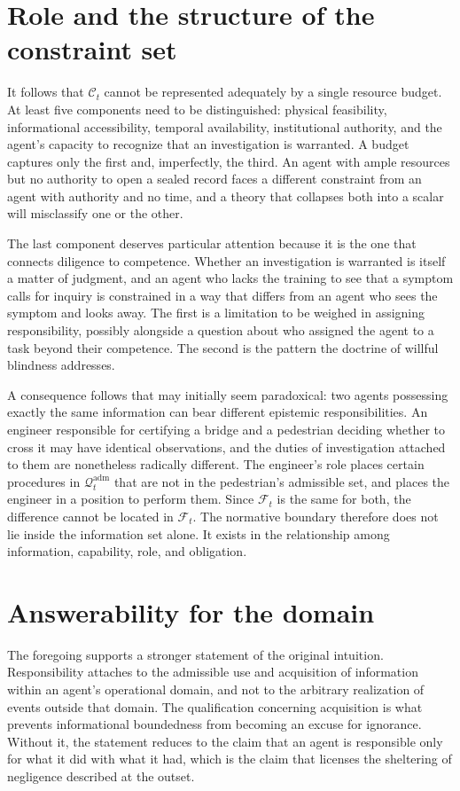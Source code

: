 \documentclass[11pt]{article}
\newcommand{\F}{\mathcal F}
\newcommand{\Q}{\mathcal Q}
\newcommand{\C}{\mathcal C}
\newcommand{\adm}{\mathrm{adm}}
\theoremstyle{definition}
\begin{document}
\section{Role and the structure of the constraint set}

It follows that $\C_t$ cannot be represented adequately by a single resource budget. At least five components need to be distinguished: physical feasibility, informational accessibility, temporal availability, institutional authority, and the agent's capacity to recognize that an investigation is warranted. A budget captures only the first and, imperfectly, the third. An agent with ample resources but no authority to open a sealed record faces a different constraint from an agent with authority and no time, and a theory that collapses both into a scalar will misclassify one or the other.

The last component deserves particular attention because it is the one that connects diligence to competence. Whether an investigation is warranted is itself a matter of judgment, and an agent who lacks the training to see that a symptom calls for inquiry is constrained in a way that differs from an agent who sees the symptom and looks away. The first is a limitation to be weighed in assigning responsibility, possibly alongside a question about who assigned the agent to a task beyond their competence. The second is the pattern the doctrine of willful blindness addresses.

A consequence follows that may initially seem paradoxical: two agents possessing exactly the same information can bear different epistemic responsibilities. An engineer responsible for certifying a bridge and a pedestrian deciding whether to cross it may have identical observations, and the duties of investigation attached to them are nonetheless radically different. The engineer's role places certain procedures in $\Q_t^{\adm}$ that are not in the pedestrian's admissible set, and places the engineer in a position to perform them. Since $\F_t$ is the same for both, the difference cannot be located in $\F_t$. The normative boundary therefore does not lie inside the information set alone. It exists in the relationship among information, capability, role, and obligation.

\section{Answerability for the domain}

The foregoing supports a stronger statement of the original intuition. Responsibility attaches to the admissible use and acquisition of information within an agent's operational domain, and not to the arbitrary realization of events outside that domain. The qualification concerning acquisition is what prevents informational boundedness from becoming an excuse for ignorance. Without it, the statement reduces to the claim that an agent is responsible only for what it did with what it had, which is the claim that licenses the sheltering of negligence described at the outset.
\end{document}
